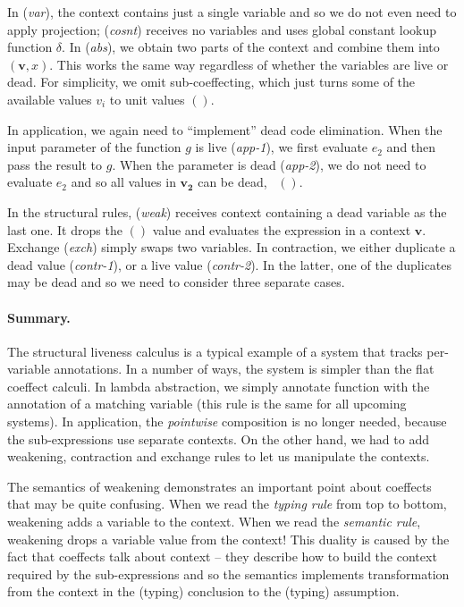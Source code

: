 In (\emph{var}), the context contains just a single variable and so we do not even need to apply
projection; (\emph{cosnt}) receives no variables and uses global constant lookup function $\delta$.
In (\emph{abs}), we obtain two parts of the context and combine them into $(\mathbf{v}, x)$. This
works the same way regardless of whether the variables are live or dead. For simplicity, we omit
sub-coeffecting, which just turns some of the available values $v_i$ to unit values $()$.

In application, we again need to ``implement'' dead code elimination. When the input parameter
of the function $g$ is live (\emph{app-1}), we first evaluate $e_2$ and then pass the result to
$g$. When the parameter is dead (\emph{app-2}), we do not need to evaluate $e_2$ and so all values
in $\mathbf{v_2}$ can be dead, \ie~$()$.

In the structural rules, (\emph{weak}) receives context containing a dead variable as the last one.
It drops the $()$ value and evaluates the expression in a context $\mathbf{v}$. Exchange (\emph{exch})
simply swaps two variables. In contraction, we either duplicate a dead value (\emph{contr-1}),
or a live value (\emph{contr-2}). In the latter, one of the duplicates may be dead and 
so we need to consider three separate cases.

\paragraph{Summary.}
The structural liveness calculus is a typical example of a system that tracks per-variable 
annotations. In a number of ways, the system is simpler than the flat coeffect calculi. In
lambda abstraction, we simply annotate function with the annotation of a matching variable 
(this rule is the same for all upcoming systems). In application, the \emph{pointwise} composition
is no longer needed, because the sub-expressions use separate contexts. On the other hand, 
we had to add weakening, contraction and exchange rules to let us manipulate the contexts.

The semantics of weakening demonstrates an important point about coeffects that may be quite
confusing. When we read the \emph{typing rule} from top to bottom, weakening adds a variable
to the context. When we read the \emph{semantic rule}, weakening drops a variable value from the 
context! This duality is caused by the fact that coeffects talk about context -- they describe
how to build the context required by the sub-expressions and so the semantics implements 
transformation from the context in the (typing) conclusion to the (typing) assumption.

